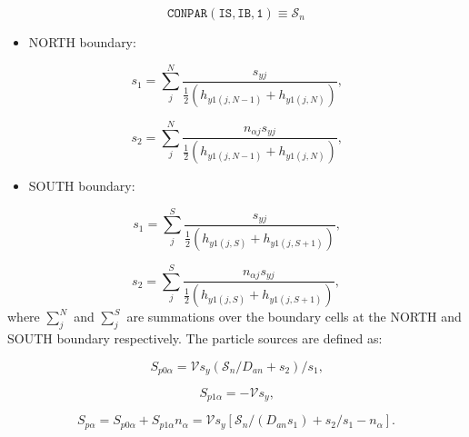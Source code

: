 \documentclass[11pt]{article}
\begin{document}
\bigskip

\begin{equation*}
\mathtt{CONPAR(IS,IB,1)}\equiv\mathcal{S}_{n}
\end{equation*}

\bigskip

\begin{itemize}
\item  NORTH boundary:
\end{itemize}

\begin{equation}
s_{1}=\sum_{j}^{N}\frac{s_{yj}}{\frac{1}{2}\left( h_{y1\left( j,N-1\right)
}+h_{y1\left( j,N\right) }\right) }\text{,}   \label{c42}
\end{equation}

\begin{equation}
s_{2}=\sum_{j}^{N}\frac{n_{\alpha j}s_{yj}}{\frac{1}{2}\left( h_{y1\left(
j,N-1\right) }+h_{y1\left( j,N\right) }\right) }\text{,}   \label{c43}
\end{equation}

\begin{itemize}
\item  SOUTH boundary:
\end{itemize}

\begin{equation}
s_{1}=\sum_{j}^{S}\frac{s_{yj}}{\frac{1}{2}\left( h_{y1\left( j,S\right)
}+h_{y1\left( j,S+1\right) }\right) }\text{,}   \label{c44}
\end{equation}

\begin{equation}
s_{2}=\sum_{j}^{S}\frac{n_{\alpha j}s_{yj}}{\frac{1}{2}\left( h_{y1\left(
j,S\right) }+h_{y1\left( j,S+1\right) }\right) },   \label{cs45}
\end{equation}
where $\sum_{j}^{N}$ and $\sum_{j}^{S}$ are summations over the boundary
cells at the NORTH and SOUTH boundary respectively. The particle sources are
defined as:

\begin{equation}
S_{p0\alpha}=\mathcal{V}s_{y}\left( \mathcal{S}_{n}/D_{an}+s_{2}\right)
/s_{1}\text{,}   \label{c46}
\end{equation}

\begin{equation}
S_{p1\alpha}=-\mathcal{V}s_{y}\text{,}   \label{c47}
\end{equation}

\begin{equation}
S_{p\alpha}=S_{p0\alpha}+S_{p1\alpha}n_{\alpha}=\mathcal{V}s_{y}\left[ 
\mathcal{S}_{n}/\left( D_{an}s_{1}\right) +s_{2}/s_{1}-n_{\alpha}\right] 
\text{.}   \label{c48}
\end{equation}
\end{document}
